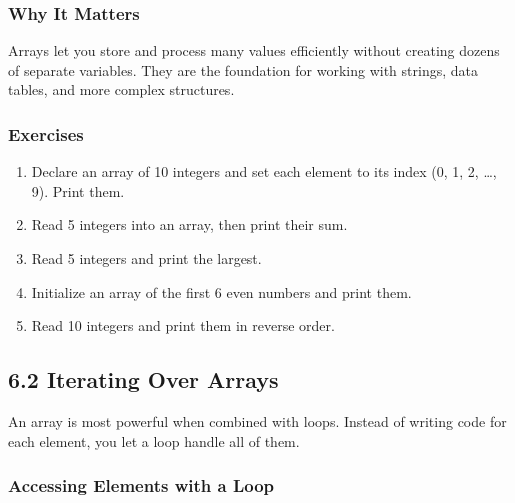 \documentclass[
  letterpaper,
  DIV=11,
  numbers=noendperiod]{scrreprt}
\providecommand{\tightlist}{%
  \setlength{\itemsep}{0pt}\setlength{\parskip}{0pt}}
\begin{document}
\subsubsection{Why It Matters}\label{why-it-matters-24}

Arrays let you store and process many values efficiently without
creating dozens of separate variables. They are the foundation for
working with strings, data tables, and more complex structures.

\subsubsection{Exercises}\label{exercises-25}

\begin{enumerate}
\def\labelenumi{\arabic{enumi}.}
\tightlist
\item
  Declare an array of 10 integers and set each element to its index (0,
  1, 2, \ldots, 9). Print them.
\item
  Read 5 integers into an array, then print their sum.
\item
  Read 5 integers and print the largest.
\item
  Initialize an array of the first 6 even numbers and print them.
\item
  Read 10 integers and print them in reverse order.
\end{enumerate}

\subsection{6.2 Iterating Over Arrays}\label{iterating-over-arrays}

An array is most powerful when combined with loops. Instead of writing
code for each element, you let a loop handle all of them.

\subsubsection{Accessing Elements with a
Loop}\label{accessing-elements-with-a-loop}
\end{document}
